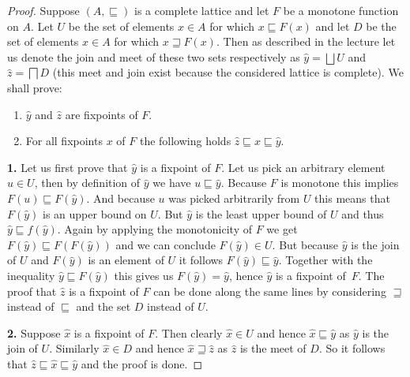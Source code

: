 \begin{proof}
	Suppose $(A,\sqsubseteq)$ is a complete lattice and let $F$ be a monotone function on $A.$ Let $U$ be the set of elements $x\in A$ for which $x\sqsubseteq F(x)$ and let $D$ be the set of elements $x\in A$ for which $x\sqsupseteq F(x).$ Then as described in the lecture let us denote the join and meet of these two sets respectively as $\hat{y}= \bigsqcup U$ and $\hat{z}=\bigsqcap D$ (this meet and join exist because the considered lattice is complete). We shall prove:
    \begin{enumerate}
        \item $\hat{y}$ and $\hat{z}$ are fixpoints of $F$.
        \item For all fixpoints $x$ of $F$ the following holds $\hat{z}\sqsubseteq x\sqsubseteq \hat{y}$.
    \end{enumerate}

    \bigskip\noindent
    {\bf 1.}
    Let us first prove that $\hat{y}$ is a fixpoint of $F.$ Let us pick an arbitrary element $u\in U$, then by definition of $\hat{y}$ we have $u\sqsubseteq \hat{y}.$ Because $F$ is monotone this implies $F(u)\sqsubseteq F(\hat{y}).$ And because $u$ was picked arbitrarily from $U$ this means that $F(\hat{y})$ is an upper bound on $U.$ But $\hat{y}$ is the least upper bound of $U$ and thus $\hat{y}\sqsubseteq f(\hat{y}).$ Again by applying the monotonicity of $F$ we get $F(\hat{y})\sqsubseteq F(F(\hat{y}))$ and we can conclude $F(\hat{y})\in U.$ But because $\hat{y}$ is the join of $U$ and $F(\hat{y})$ is an element of $U$ it follows $F(\hat{y})\sqsubseteq \hat{y}.$ Together with the inequality $\hat{y}\sqsubseteq F(\hat{y})$ this gives us $F(\hat{y})=\hat{y}$, hence $\hat{y}$ is a fixpoint of~$F$. The proof that $\hat{z}$ is a fixpoint of $F$ can be done along the same lines by considering $\sqsupseteq$ instead of $\sqsubseteq$ and the set $D$ instead of $U.$

    \bigskip\noindent
    {\bf 2.}
    Suppose $\hat{x}$ is a fixpoint of $F$. Then clearly $\hat{x}\in U$ and hence $\hat{x}\sqsubseteq \hat{y}$ as $\hat{y}$ is the join of $U.$ Similarly $\hat{x}\in D$ and hence $\hat{x}\sqsupseteq \hat{z}$ as $\hat{z}$ is the meet of $D.$ So it follows that $\hat{z}\sqsubseteq\hat{x}\sqsubseteq\hat{y}$ and the proof is done.
\end{proof}



